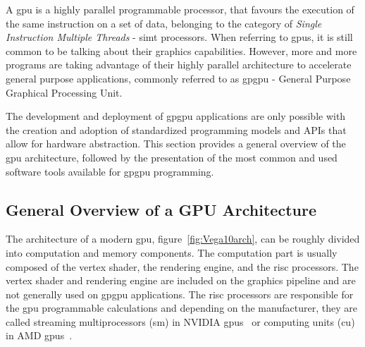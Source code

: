 A \acrshort{gpu} is a highly parallel programmable processor, that favours the execution of the same instruction on a set of data, belonging to the category of \textit{Single Instruction Multiple Threads} - \acrshort{simt} processors. When referring to \acrshort{gpu}s, it is still common to be talking about their graphics capabilities. However, more and more programs are taking advantage of their highly parallel architecture to accelerate general purpose applications, commonly referred to as \acrshort{gpgpu} - General Purpose Graphical Processing Unit.

The development and deployment of \acrshort{gpgpu} applications are only possible with the creation and adoption of standardized programming models and APIs that allow for hardware abstraction. This section provides a general overview of the \acrshort{gpu} architecture, followed by the presentation of the most common and used software tools available for \acrshort{gpgpu} programming.




\subsection{General Overview of a GPU Architecture}
The architecture of a modern \acrshort{gpu}, figure~\ref{fig:Vega10arch}, can be roughly divided into computation and memory components. The computation part is usually composed of the vertex shader, the rendering engine, and the \acrshort{risc} processors. The vertex shader and rendering engine are included on the graphics pipeline and are not generally used on \acrshort{gpgpu} applications. The \acrshort{risc} processors are responsible for the \acrshort{gpu} programmable calculations and depending on the manufacturer, they are called streaming multiprocessors (\acrshort{sm}) in NVIDIA \acrshort{gpu}s~\cite{nvidia_cuda_2008} or computing units (\acrshort{cu}) in AMD \acrshort{gpu}s~\cite{amd_amd_2008}.  

